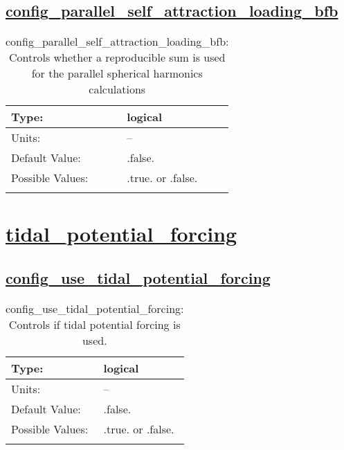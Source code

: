\subsection[config\_parallel\_self\_attraction\_loading\_bfb]{\hyperref[sec:nm_tab_self_attraction_loading]{config\_parallel\_self\_attraction\_loading\_bfb}}
\label{subsec:nm_sec_config_parallel_self_attraction_loading_bfb}
\begin{center}
\begin{longtable}{| p{2.0in} || p{4.0in} |}
    \hline
    Type: & logical \\
    \hline
    Units: & -- \\
    \hline
    Default Value: & .false. \\
    \hline
    Possible Values: & .true. or .false. \\
    \hline
    \caption{config\_parallel\_self\_attraction\_loading\_bfb: Controls whether a reproducible sum is used for the parallel spherical harmonics calculations}
\end{longtable}
\end{center}
\section[tidal\_potential\_forcing]{\hyperref[sec:nm_tab_tidal_potential_forcing]{tidal\_potential\_forcing}}
\label{sec:nm_sec_tidal_potential_forcing}
\subsection[config\_use\_tidal\_potential\_forcing]{\hyperref[sec:nm_tab_tidal_potential_forcing]{config\_use\_tidal\_potential\_forcing}}
\label{subsec:nm_sec_config_use_tidal_potential_forcing}
\begin{center}
\begin{longtable}{| p{2.0in} || p{4.0in} |}
    \hline
    Type: & logical \\
    \hline
    Units: & -- \\
    \hline
    Default Value: & .false. \\
    \hline
    Possible Values: & .true. or .false. \\
    \hline
    \caption{config\_use\_tidal\_potential\_forcing: Controls if tidal potential forcing is used.}
\end{longtable}
\end{center}
